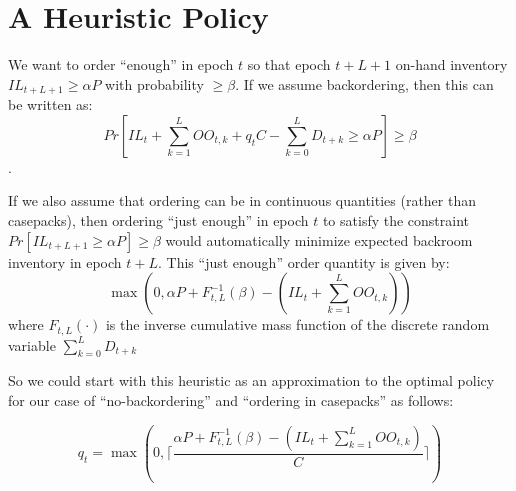 \documentclass[12pt]{amsart}
\begin{document}
\section{A Heuristic Policy}
We want to order ``enough'' in epoch $t$ so that epoch $t+L+1$ on-hand inventory $IL_{t+L+1} \geq \alpha P$ with probability $\geq \beta$. If we assume backordering, then this can be written as:
$$Pr[IL_t + \sum_{k=1}^L OO_{t,k} + q_t C - \sum_{k=0}^L D_{t+k} \geq \alpha P] \geq \beta$$.

If we also assume that ordering can be in continuous quantities (rather than casepacks), then ordering ``just enough'' in epoch $t$ to satisfy the constraint $Pr[IL_{t+L+1} \geq \alpha P] \geq \beta$ would automatically minimize expected backroom inventory in epoch $t+L$. This ``just enough'' order quantity is given by:
$$\max(0, \alpha P + F_{t,L}^{-1}(\beta) - (IL_t + \sum_{k=1}^L OO_{t,k}))$$
where $F_{t,L}(\cdot)$ is the inverse cumulative mass function of the discrete random variable $\sum_{k=0}^L D_{t+k}$

So we could start with this heuristic as an approximation to the optimal policy for our case of ``no-backordering'' and ``ordering in casepacks'' as follows:

$$q_t = \max(0, \lceil \frac {\alpha P + F_{t,L}^{-1}(\beta) - (IL_t + \sum_{k=1}^L OO_{t,k})} C \rceil)$$
\end{document}

